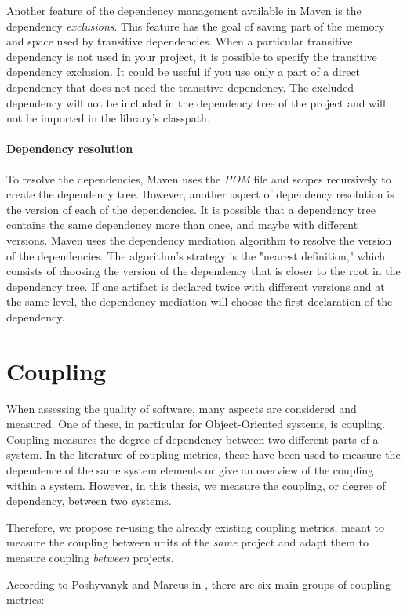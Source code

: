 Another feature of the dependency management available in Maven is the dependency \textit{exclusions}. This feature has the goal of saving part of the memory and space used by transitive dependencies. When a particular transitive dependency is not used in your project, it is possible to specify the transitive dependency exclusion. It could be useful if you use only a part of a direct dependency that does not need the transitive dependency. The excluded dependency will not be included in the dependency tree of the project and will not be imported in the library's classpath.

\paragraph{Dependency resolution}
To resolve the dependencies, Maven uses the \textit{POM} file and scopes recursively to create the dependency tree. However, another aspect of dependency resolution is the version of each of the dependencies. It is possible that a dependency tree contains the same dependency more than once, and maybe with different versions. Maven uses the dependency mediation algorithm to resolve the version of the dependencies. The algorithm's strategy is the "nearest definition," which consists of choosing the version of the dependency that is closer to the root in the dependency tree. If one artifact is declared twice with different versions and at the same level, the dependency mediation will choose the first declaration of the dependency.

\section{Coupling}\label{section:bg-coupling}
When assessing the quality of software, many aspects are considered and measured. One of these, in particular for Object-Oriented systems, is coupling. Coupling measures the degree of dependency between two different parts of a system. In the literature of coupling metrics, these have been used to measure the dependence of the same system elements or give an overview of the coupling within a system. However, in this thesis, we measure the coupling, or degree of dependency, between two systems.

Therefore, we propose re-using the already existing coupling metrics, meant to measure the coupling between units of the \textit{same} project and adapt them to measure coupling \textit{between} projects.

\blankl
According to Poshyvanyk and Marcus in \cite{poshyvanyk2006conceptual}, there are six main groups of coupling metrics:

